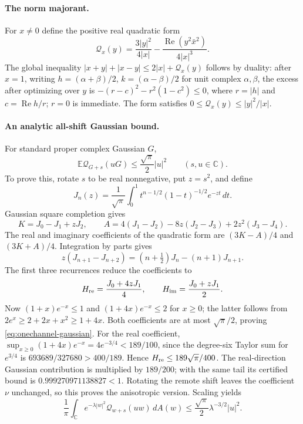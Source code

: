 \paragraph{The norm majorant.}
For $x\ne0$ define the positive real quadratic form
\[
 \mathcal Q_x(y)=\frac{3|y|^2}{4|x|}-\frac{\operatorname{Re}(y^2\bar x^2)}{4|x|^3}.
\]
The global inequality $|x+y|+|x-y|\le2|x|+\mathcal Q_x(y)$ follows by duality: after $x=1$, writing $h=(\alpha+\beta)/2$, $k=(\alpha-\beta)/2$ for unit complex $\alpha,\beta$, the excess after optimizing over $y$ is $-(r-c)^2-r^2(1-c^2)\le0$, where $r=|h|$ and $c=\operatorname{Re}h/r$; $r=0$ is immediate. The form satisfies $0\le\mathcal Q_x(y)\le |y|^2/|x|$.

\paragraph{An analytic all-shift Gaussian bound.}
For standard proper complex Gaussian $G$,
\begin{equation}\label{eq:onechannel-gaussian}
 \mathbb E\mathcal Q_{G+s}(uG)\le\frac{\sqrt\pi}{2}|u|^2
 \qquad(s,u\in\mathbb C).
\end{equation}
To prove this, rotate $s$ to be real nonnegative, put $z=s^2$, and define
\[
 J_n(z)=\frac1{\sqrt\pi}\int_0^1 t^{n-1/2}(1-t)^{-1/2}e^{-zt}\,dt.
\]
Gaussian square completion gives
\[
 K=J_0-J_1+zJ_2,\qquad
 A=4(J_1-J_2)-8z(J_2-J_3)+2z^2(J_3-J_4).
\]
The real and imaginary coefficients of the quadratic form are $(3K-A)/4$ and $(3K+A)/4$. Integration by parts gives
\[
 z(J_{n+1}-J_{n+2})=(n+\tfrac12)J_n-(n+1)J_{n+1}.
\]
The first three recurrences reduce the coefficients to
\[
 H_{\rm re}=\frac{J_0+4zJ_1}{4},\qquad H_{\rm im}=\frac{J_0+zJ_1}{2}.
\]
Now $(1+x)e^{-x}\le1$ and $(1+4x)e^{-x}\le2$ for $x\ge0$; the latter follows from $2e^x\ge2+2x+x^2\ge1+4x$. Both coefficients are at most $\sqrt\pi/2$, proving \eqref{eq:onechannel-gaussian}. For the real coefficient, $\sup_{x\ge0}(1+4x)e^{-x}=4e^{-3/4}<189/100$, since the degree-six Taylor sum for $e^{3/4}$ is $693689/327680>400/189$. Hence $H_{\rm re}\le189\sqrt\pi/400$. The real-direction Gaussian contribution is multiplied by $189/200$; with the same tail its certified bound is $0.999270971138827<1$. Rotating the remote shift leaves the coefficient $\nu$ unchanged, so this proves the anisotropic version. Scaling yields
\[
 \frac1\pi\int_{\mathbb C}e^{-\lambda|w|^2}\mathcal Q_{w+s}(uw)\,dA(w)
 \le\frac{\sqrt\pi}{2}\lambda^{-3/2}|u|^2.
\]


